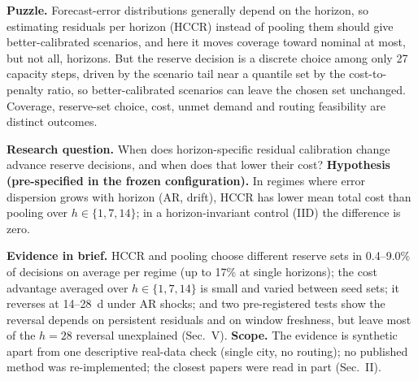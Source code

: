 \documentclass[conference]{IEEEtran}
\begin{document}
\textbf{Puzzle.} Forecast-error distributions generally depend on the horizon, so estimating residuals per horizon (HCCR) instead of pooling them should give better-calibrated scenarios, and here it moves coverage toward nominal at most, but not all, horizons. But the reserve decision is a discrete choice among only 27 capacity steps, driven by the scenario tail near a quantile set by the cost-to-penalty ratio, so better-calibrated scenarios can leave the chosen set unchanged. Coverage, reserve-set choice, cost, unmet demand and routing feasibility are distinct outcomes.

\textbf{Research question.} When does horizon-specific residual calibration change advance reserve decisions, and when does that lower their cost?
\textbf{Hypothesis (pre-specified in the frozen configuration).} In regimes where error dispersion grows with horizon (AR, drift), HCCR has lower mean total cost than pooling over $h\in\{1,7,14\}$; in a horizon-invariant control (IID) the difference is zero.

\textbf{Evidence in brief.} HCCR and pooling choose different reserve sets in 0.4--9.0\% of decisions on average per regime (up to 17\% at single horizons); the cost advantage averaged over $h\in\{1,7,14\}$ is small and varied between seed sets; it reverses at 14--28~d under AR shocks; and two pre-registered tests show the reversal depends on persistent residuals and on window freshness, but leave most of the $h{=}28$ reversal unexplained (Sec.~V). \textbf{Scope.} The evidence is synthetic apart from one descriptive real-data check (single city, no routing); no published method was re-implemented; the closest papers were read in part (Sec.~II).
\end{document}
